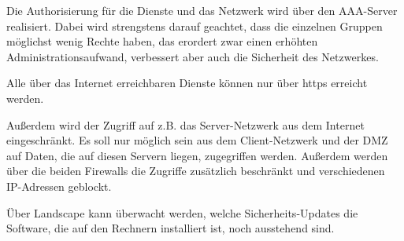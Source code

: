Die Authorisierung für die Dienste und das Netzwerk wird über den AAA-Server realisiert. Dabei wird strengstens darauf geachtet, dass die einzelnen Gruppen möglichst wenig Rechte haben, das erordert zwar einen erhöhten Administrationsaufwand, verbessert aber auch die Sicherheit des Netzwerkes.

Alle über das Internet erreichbaren Dienste können nur über https erreicht werden.

Außerdem wird der Zugriff auf z.B. das Server-Netzwerk aus dem Internet eingeschränkt. Es soll nur möglich sein aus dem Client-Netzwerk und der DMZ auf Daten, die auf diesen Servern liegen, zugegriffen werden. Außerdem werden über die beiden Firewalls die Zugriffe zusätzlich beschränkt und verschiedenen IP-Adressen geblockt.

Über Landscape kann überwacht werden, welche Sicherheits-Updates die Software, die auf den Rechnern installiert ist, noch ausstehend sind.
